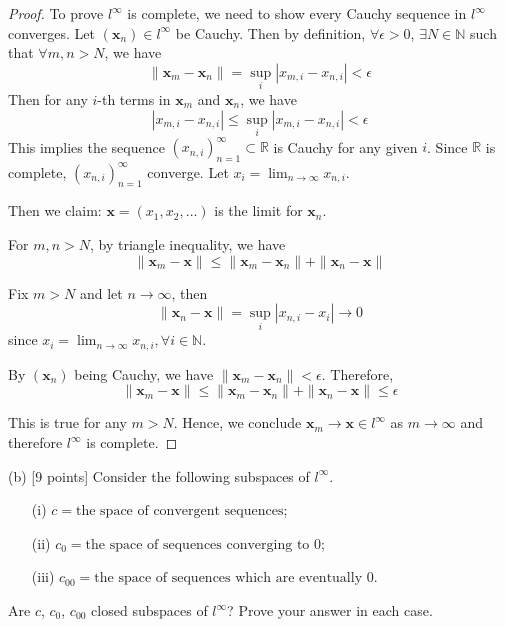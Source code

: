 \documentclass[11pt,a4paper]{amsart}
\def\R{{\mathbb R}}
\def\N{{\mathbb N}}
\def\e{\epsilon}
\begin{document}
\begin{proof}
  To prove $l^\infty$ is complete, we need to show every Cauchy sequence in $l^\infty$ converges.
  Let $(\bm x_n) \in l^\infty$ be Cauchy. Then by definition,
  $\forall\e>0$, $\exists N\in\N$ such that $\forall m,n>N$, we have
  $$\| \bm x_m - \bm x_n \| = \sup_{i}|x_{m,i}-x_{n,i}|<\e $$
  Then for any $i$-th terms in $\bm x_m$ and $\bm x_n$, we have
  $$ |x_{m,i} - x_{n,i}| \le \sup_{i}|x_{m,i}-x_{n,i}|<\e $$
  This implies the sequence $(x_{n,i})_{n=1}^{\infty} \subset \R$ is Cauchy for any given $i$.
  Since $\R$ is complete, $(x_{n,i})_{n=1}^{\infty}$ converge.
  Let $x_i = \lim_{n\to\infty} x_{n,i}$.

  Then we claim: $\bm x = (x_1, x_2, \dots)$ is the limit for $\bm x_n$.

  For $m,n>N$, by triangle inequality, we have
  $$ \|\bm x_m - \bm x \| \le \|\bm x_m - \bm x_n\| + \|\bm x_n - \bm x \| $$

  Fix $m>N$ and let $n\to\infty$, then
  $$ \|\bm x_n - \bm x \| = \sup_{i} |x_{n,i} - x_i| \to 0 $$
  since $x_i = \lim_{n\to\infty} x_{n,i}, \forall i\in\N$.

  By $(\bm x_n)$ being Cauchy, we have $\|\bm x_m - \bm x_n\| < \e $. Therefore,
  $$ \|\bm x_m - \bm x \| \le \|\bm x_m - \bm x_n\| + \|\bm x_n - \bm x \| \le\e $$

  This is true for any $m>N$. Hence, we conclude $\bm x_m\to \bm x \in l^\infty$
  as $m\to\infty$ and therefore $l^\infty$ is complete.
\end{proof}
\medskip

(b) [9 points] Consider the following subspaces of $l^\infty$.
\begin{itemize}
	\item[(i)]  $c=\mbox{the space of convergent sequences}$;  \medskip

	\item[(ii)] $c_0=\mbox{the space of sequences converging to 0}$;  \medskip

	\item[(iii)] $ c_{00}=\mbox{the space of sequences which are eventually 0}$.  \smallskip

\end{itemize}

Are $c$, $c_0$, $c_{00}$ closed subspaces of $l^\infty$? Prove your answer in each case.
\end{document}
